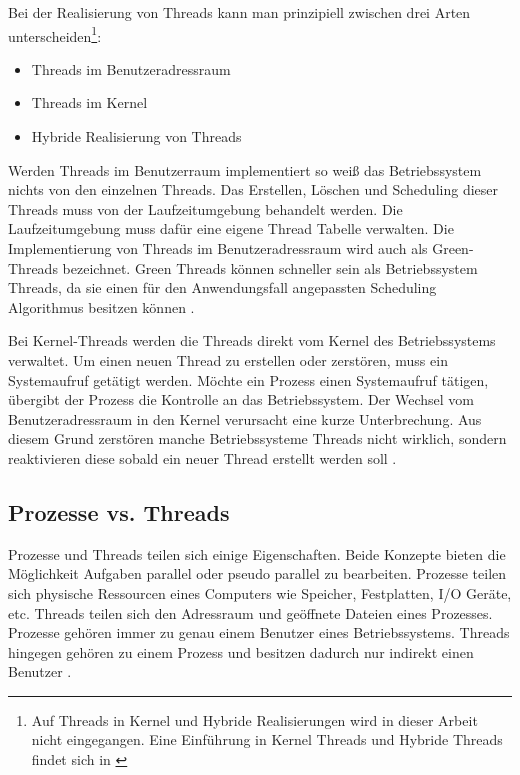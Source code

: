 Bei der Realisierung von Threads kann man prinzipiell zwischen drei Arten unterscheiden\footnote{Auf Threads in Kernel und Hybride Realisierungen wird in dieser Arbeit nicht eingegangen. Eine Einführung in Kernel Threads und Hybride Threads findet sich in \cite[p. 109-110]{tan09}}:

\begin{itemize}
  \item Threads im Benutzeradressraum
  \item Threads im Kernel 
  \item Hybride Realisierung von Threads
\end{itemize}

Werden Threads im Benutzerraum implementiert so weiß das Betriebssystem nichts von den einzelnen Threads. Das Erstellen, Löschen und Scheduling dieser Threads muss von der Laufzeitumgebung  behandelt werden. Die Laufzeitumgebung muss dafür eine eigene Thread Tabelle verwalten. Die Implementierung von Threads im Benutzeradressraum wird auch als Green-Threads bezeichnet. Green Threads können schneller sein als Betriebssystem Threads, da sie einen für den Anwendungsfall angepassten Scheduling Algorithmus besitzen können \cite[p. 106-108]{tan09}.

Bei Kernel-Threads werden die Threads direkt vom Kernel des Betriebssystems verwaltet. Um einen neuen Thread zu erstellen oder zerstören, muss ein Systemaufruf getätigt werden. Möchte ein Prozess einen Systemaufruf tätigen, übergibt der Prozess die Kontrolle an das Betriebssystem. Der Wechsel vom Benutzeradressraum in den Kernel verursacht eine kurze Unterbrechung. Aus diesem Grund zerstören manche Betriebssysteme Threads nicht wirklich, sondern reaktivieren diese sobald ein neuer Thread erstellt werden soll \cite[p. 59, p. 106-108]{tan09}.

\subsection{Prozesse vs. Threads}

Prozesse und Threads teilen sich einige Eigenschaften. Beide Konzepte bieten die Möglichkeit Aufgaben parallel oder pseudo parallel zu bearbeiten. Prozesse teilen sich physische Ressourcen eines Computers wie Speicher, Festplatten, I/O Geräte, etc. Threads teilen sich den Adressraum und geöffnete Dateien eines Prozesses. Prozesse gehören immer zu genau einem Benutzer eines Betriebssystems. Threads hingegen gehören zu einem Prozess und besitzen dadurch nur indirekt einen Benutzer \cite[p. 89]{tan09}. 


